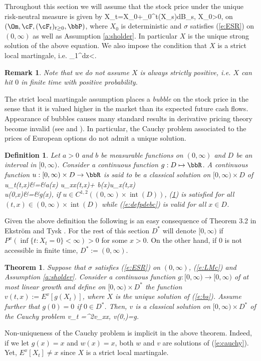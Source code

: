 \documentclass[11pt,reqno]{amsart}
\numberwithin{equation}{section}
\newtheorem{theorem}{Theorem}[section]
\newtheorem{remark}{Remark}[section]
\newtheorem{definition}{Definition}[section]
\DeclareMathOperator{\interior}{int}
\begin{document}
Throughout this section we will assume that the stock price under the unique risk-neutral measure is given by
\be \label{e:bs}
X_t=X_0+\int_0^{t}\sigma(X_s)dB_s, \quad X_0>0,
\ee
on $(\Om, \cF,(\cF_t)_{t \geq 0}, \bbP)$, where $X_0$ is deterministic and $\sigma$ satisfies (\ref{e:ESR}) on $(0,\infty)$ as well as Assumption \ref{a:sholder}. In particular $X$ is the unique strong solution of the above equation. We also impose the condition that $X$ is a strict local martingale, i.e.
\be \label{e:LMc}
\int_1^{\infty}dz<\infty.
\ee
\begin{remark} Note that we do not assume $X$ is always strictly positive, i.e. $X$ can hit $0$ in finite time with positive probability. 
\end{remark} 
The strict local martingale assumption places a {\em bubble} on the stock price in the sense that it   is valued  higher in the market than its expected future cash flows. Appearance of bubbles causes many standard results in derivative pricing theory become invalid (see \cite{CH} and \cite{PP}). In particular, the Cauchy problem associated to the prices of  European options do not admit a unique solution.
\begin{definition}
	Let $a>0$ and $b$ be measurable functions on $(0,\infty)$ and $D$ be an interval  in $[0,\infty)$. Consider a continuous function $g:D\mapsto \bbR$. A continuous function $u:[0,\infty)\times D\to \bbR$ is said to be a classical solution on $[0,\infty)\times D$ of 
	\bea
	u_t(t,x)&=&a(x) u_{xx}(t,x)+ b(x)u_x(t,x)\label{e:defpde} \\
	u(0,x)&=&g(x), \label{e:defpdebc}
	\eea
	if $u \in C^{1,2}((0,\infty)\times \interior(D))$,  (\ref{e:defpde}) is satisfied for all $(t,x) \in (0,\infty)\times \interior(D)$ while (\ref{e:defpdebc}) is valid for all $x \in D$.
\end{definition} 
Given the above definition the following is an easy consequence of Theorem 3.2 in Ekstr\"om and Tysk \cite{ET}. For the rest of this section $D^*$ will denote $[0,\infty)$ if $P^x(\inf\{t: X_t=0\}<\infty)>0$ for some $x>0$. On the other hand, if $0$ is not accessible in finite time, $D^*:=(0,\infty)$.
\begin{theorem} \label{t:ET} Suppose that $\sigma$ satisfies (\ref{e:ESR}) on $(0,\infty)$, (\ref{e:LMc}) and Assumption \ref{a:sholder}. Consider a continuous  function $g:[0,\infty) \to [0,\infty)$ of at most linear growth and define on $[0,\infty)\times D^*$ the function $v(t,x):= E^x[g(X_t)]$, where $X$ is the unique solution of (\ref{e:bs}).  Assume further that $g(0)=0$ if $0\in D^*$. Then, $v$ is a classical solution on  $[0,\infty)\times D^*$ of the Cauchy problem
\be \label{e:cauchy}
v_t =\sigma^2v_{xx}, \qquad v(0,\cdot)=g.
\ee
\end{theorem}
Non-uniqueness of the Cauchy problem is implicit in the above theorem. Indeed, if we let $g(x)=x$ and $w(x)=x$, both $w$ and $v$ are solutions of (\ref{e:cauchy}). Yet, $E^x[X_t]\neq x$ since $X$ is a strict local martingale.
\end{document}
